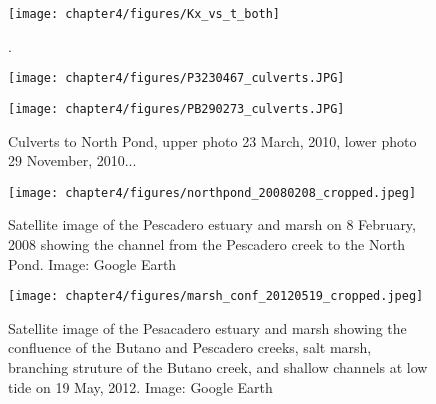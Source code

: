 \begin{figure}
	\texttt{[image: chapter4/figures/Kx\_vs\_t\_both]}
	\caption{.}  \label{fig:Kxvst}
\end{figure}



\begin{figure}
\centering
	\texttt{[image: chapter4/figures/P3230467\_culverts.JPG]}

	\texttt{[image: chapter4/figures/PB290273\_culverts.JPG]}

\caption{Culverts to North Pond, upper photo 23 March, 2010, lower photo 29 November, 2010... } \label{fig:photoCulverts}
\end{figure}





\begin{figure}
\centering
	\texttt{[image: chapter4/figures/northpond\_20080208\_cropped.jpeg]}
	\caption{Satellite image of the Pescadero estuary and marsh on 8 February, 2008 showing the channel from the Pescadero creek to the North Pond. Image: Google Earth} \label{fig:geNP}
\end{figure}


\begin{figure}
\centering
	\texttt{[image: chapter4/figures/marsh\_conf\_20120519\_cropped.jpeg]}
	\caption{Satellite image of the Pesacadero estuary and marsh showing the confluence of the Butano and Pescadero creeks, salt marsh, branching struture of the Butano creek, and shallow channels at low tide on 19 May, 2012. Image: Google Earth} \label{fig:geMarsh}
\end{figure}
